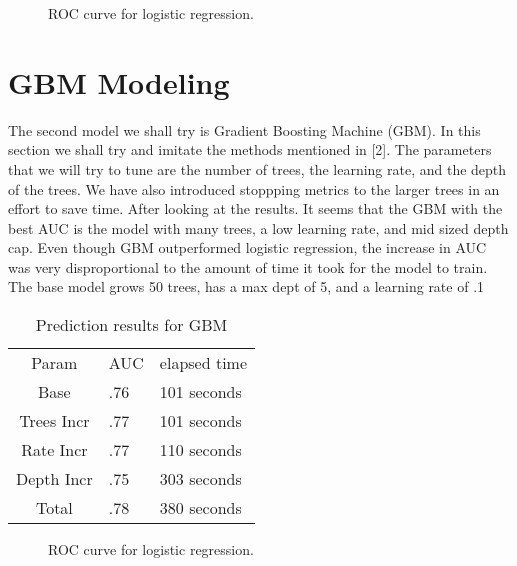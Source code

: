 \documentclass[twocolumn,11pt]{asme2ej}
\begin{document}
\begin{figure}
\centerline{}
\caption{ROC curve for logistic regression.}
\label{model}
\end{figure}

\section{GBM Modeling}
The second model we shall try is Gradient Boosting Machine (GBM). In this section we shall try and imitate the methods mentioned in \cite{gbm}[2]. The parameters that we will try to tune are the number of trees, the learning rate, and the depth of the trees. We have also introduced stoppping metrics to the larger trees in an effort to save time. After looking at the results. It seems that the GBM with the best AUC is the model with many trees, a low learning rate, and mid sized depth cap. Even though GBM outperformed logistic regression, the increase in AUC was very disproportional to the amount of time it took for the model to train. The base model grows 50 trees, has a max dept of 5, and a learning rate of .1

\begin{table}[t]
\caption{Prediction results for GBM}
\begin{center}
\label{table_ASME}
\begin{tabular}{c l l}
& &\\ %
\hline
Param & AUC & elapsed time\\
\hline
Base & .76 & 101 seconds \\
Trees Incr &  .77 & 101 seconds \\
Rate Incr &  .77 & 110 seconds \\
Depth Incr & .75 &  303 seconds \\
Total & .78 & 380 seconds \\
\hline
\end{tabular}
\end{center}
\end{table}

\begin{figure}
\centerline{}
\caption{ROC curve for logistic regression.}
\label{model}
\end{figure}
\end{document}
